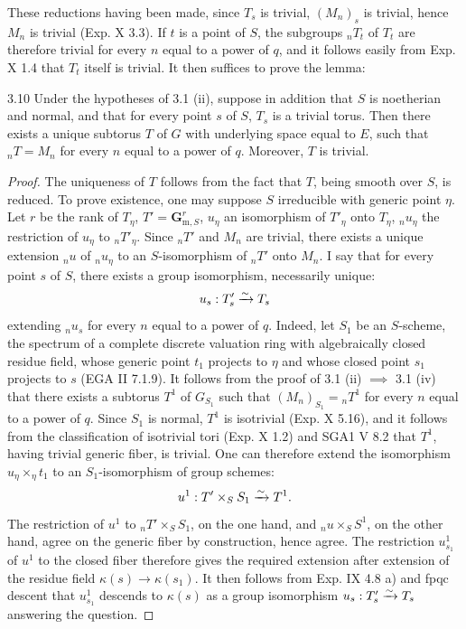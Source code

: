 These reductions having been made, since $T_s$ is trivial, $(M_n)_s$ is trivial, hence $M_n$ is trivial (Exp. X 3.3). If $t$ is a point of $S$, the subgroups ${}_nT_t$ of $T_t$ are therefore trivial for every $n$ equal to a power of $q$, and it follows easily from Exp. X 1.4 that $T_t$ itself is trivial. It then suffices to prove the lemma:
\begin{lemma}{3.10}\label{XV.3.10}
Under the hypotheses of 3.1 (ii), suppose in addition that $S$ is noetherian and normal, and that for every point $s$ of $S$, $T_s$ is a trivial torus. Then there exists a unique subtorus $T$ of $G$ with underlying space equal to $E$, such that ${}_nT=M_n$ for every $n$ equal to a power of $q$. Moreover, $T$ is trivial.
\end{lemma}
\begin{proof}
The uniqueness of $T$ follows from the fact that $T$, being smooth over $S$, is reduced. To prove existence, one may suppose $S$ irreducible with generic point $\eta$. Let $r$ be the rank of $T_\eta$, $T'=\mathbf G_{\mathrm m,S}^r$, $u_\eta$ an isomorphism of $T'_\eta$ onto $T_\eta$, ${}_nu_\eta$ the restriction of $u_\eta$ to ${}_nT'_\eta$. Since ${}_nT'$ and $M_n$ are trivial, there exists a unique extension ${}_nu$ of ${}_nu_\eta$ to an $S$-isomorphism of ${}_nT'$ onto $M_n$. I say that for every point $s$ of $S$, there exists a group isomorphism, necessarily unique:
\[
u_s:T'_s\xrightarrow{\sim} T_s
\]
extending ${}_nu_s$ for every $n$ equal to a power of $q$. Indeed, let $S_1$ be an $S$-scheme, the spectrum of a complete discrete valuation ring with algebraically closed residue field, whose generic point $t_1$ projects to $\eta$ and whose closed point $s_1$ projects to $s$ (EGA II 7.1.9). It follows from the proof of 3.1 (ii) $\implies$ 3.1 (iv) that there exists a subtorus $T^1$ of $G_{S_1}$ such that $(M_n)_{S_1}={}_nT^1$ for every $n$ equal to a power of $q$. Since $S_1$ is normal, $T^1$ is isotrivial (Exp. X 5.16), and it follows from the classification of isotrivial tori (Exp. X 1.2) and SGA1 V 8.2 that $T^1$, having trivial generic fiber, is trivial. One can therefore extend the isomorphism $u_\eta\times_\eta t_1$ to an $S_1$-isomorphism of group schemes:
\[
u^1:T'\times_S S_1\xrightarrow{\sim} T^1.
\]
The restriction of $u^1$ to ${}_nT'\times_S S_1$, on the one hand, and ${}_nu\times_S S^1$, on the other hand, agree on the generic fiber by construction, hence agree. The restriction $u^1_{s_1}$ of $u^1$ to the closed fiber therefore gives the required extension after extension of the residue field $\kappa(s)\to\kappa(s_1)$. It then follows from Exp. IX 4.8 a) and fpqc descent that $u^1_{s_1}$ descends to $\kappa(s)$ as a group isomorphism $u_s:T'_s\xrightarrow{\sim} T_s$ answering the question.


\end{proof}
